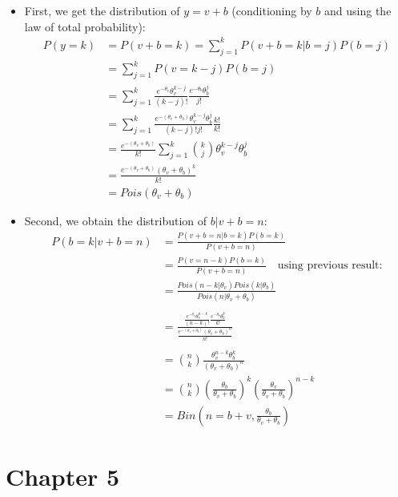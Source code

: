 \documentclass[]{article}
\begin{document}
\begin{itemize}
\item
  First, we get the distribution of \(y = v + b\) (conditioning by \(b\)
  and using the law of total probability): \[
  \begin{aligned}
  P(y=k) &= P(v+b=k) = \sum_{j=1}^{k} P(v + b = k|b = j)P(b = j)\\  
  &= \sum_{j=1}^{k} P(v = k - j)P(b = j)\\  
  &= \sum_{j=1}^{k} \frac{e^{ -\theta_{v} } \theta_{v}^{k - j} }{(k-j)!} \frac{e^{ -\theta_{b} } \theta_{b}^{j} }{j!}\\  
  &= \sum_{j=1}^{k} \frac{e^{ -(\theta_{v} + \theta_{b}) } \theta_{v}^{k - j} \theta_{b}^{j}  }{(k-j)!j!} \frac{k!}{k!}\\
  &= \frac{e^{ -(\theta_{v} + \theta_{b}) } }{k!}  \sum_{j=1}^{k} {k \choose j} \theta_{v}^{k - j} \theta_{b}^{j}\\
  &= \frac{e^{ -(\theta_{v} + \theta_{b}) }  (\theta_{v} + \theta_{b})^k}{k!}  \\
  &= Pois(\theta_{v} + \theta_{b})
  \end{aligned}
  \]
\item
  Second, we obtain the distribution of \(b|v+b=n\): \[
  \begin{aligned}
  P(b=k|v+b = n) &= \frac{P(v + b = n|b = k) P(b = k)}{P(v + b = n)} \\
  &= \frac{P(v = n - k) P(b = k)}{P(v + b = n)} \quad \text{using previous result:}\\
  &= \frac{Pois(n - k|\theta_{v})Pois(k|\theta_{b})}{Pois(n|\theta_{v} + \theta_{b})}\\
  \\
  &= \frac{ \frac{e^{ -\theta_{v} } \theta_{v}^{n - k} }{(n - k)!}    \frac{e^{ -\theta_{b} } \theta_{b}^{k} }{k!} }{    \frac{e^{ -(\theta_{v}+\theta_{b}) } (\theta_{v}+\theta_{b})^{n} }{n!}  }\\
  \\
  &= {n \choose k} \frac{\theta_{v}^{n-k} \theta_{b}^{k}}{(\theta_{v}+\theta_{b})^{n}} \\
  &= {n \choose k} \left( \frac{ \theta_{b} }{\theta_{v}+\theta_{b}} \right)^{k} \left( \frac{\theta_{v}}{\theta_{v}+\theta_{b}} \right)^{n - k}\\
  &= Bin \left( n=b+v, \frac{\theta_{b}}{\theta_{v}+\theta_{b}} \right)
  \end{aligned}
  \]
\end{itemize}

\section{Chapter 5}\label{chapter-5}
\end{document}
